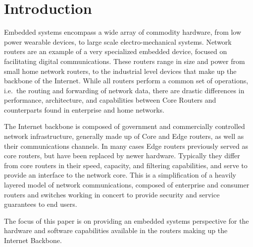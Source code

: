 \section{Introduction}

Embedded systems encompass a wide array of commodity hardware, from low power
wearable devices, to large scale electro-mechanical systems. Network routers
are an example of a very specialized embedded device, focused on facilitating
digital communications. These routers range in size and power from small home
network routers, to the industrial level devices that make up the backbone of
the Internet. While all routers perform a common set of operations, i.e.\ the
routing and forwarding of network data, there are drastic differences in
performance, architecture, and capabilities between Core Routers and
counterparts found in enterprise and home networks.

The Internet backbone is composed of government and commercially controlled
network infrastructure, generally made up of Core and Edge routers, as well as
their communications channels. In many cases Edge routers previously served as
core routers, but have been replaced by newer hardware. Typically they differ
from core routers in their speed, capacity, and filtering capabilities, and
serve to provide an interface to the network core. This is a simplification of
a heavily layered model of network communications, composed of enterprise and
consumer routers and switches working in concert to provide security and
service guarantees to end users.

The focus of this paper is on providing an embedded systems perspective for
the hardware and software capabilities available in the routers making up the
Internet Backbone.



